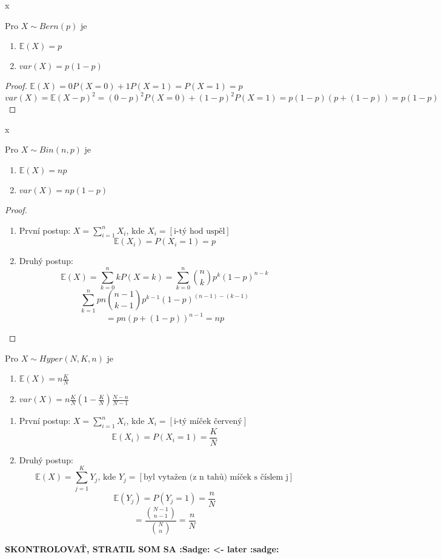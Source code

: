 \documentclass[../main.tex]{subfiles}
\begin{document}
\begin{theorem}
    {\color{white} x}

    Pro $X\sim Bern(p)$ je 
    \begin{enumerate}
        \item $\mathbb{E}(X) = p$
        \item $var(X) = p(1-p)$
    \end{enumerate}
\end{theorem}
\begin{proof}
    $\mathbb{E}(X) = 0P(X=0)+1P(X=1) = P(X=1) = p$\\
    $var(X) = \mathbb{E}(X-p)^2 = (0-p)^2P(X=0) + (1-p)^2P(X=1) = p(1-p)(p+(1-p)) = p(1-p)$
\end{proof}

\begin{theorem}
    {\color{white} x}

    Pro $X\sim Bin(n,p)$ je
    \begin{enumerate}
        \item $\mathbb{E}(X) = np$
        \item $var(X) = np(1-p)$
    \end{enumerate}
\end{theorem}
\begin{proof}
    \begin{enumerate}
        \item První postup: $X = \sum^n_{i=1}X_i$, kde $X_i = [\text{i-tý hod uspěl}]$
        \[\mathbb{E}(X_i) = P(X_i = 1) = p\]
        \item Druhý postup:
        \[\mathbb{E}(X) = \sum^n_{k=0} kP(X=k) = \sum^n_{k=0}\binom{n}{k}p^k(1-p)^{n-k}\]
        \[\sum_{k=1}^n pn \binom{n-1}{k-1}p^{k-1}(1-p)^{(n-1) - (k-1)}\]
        \[ = pn (p + (1-p))^{n-1} = np\]
    \end{enumerate}
\end{proof}

\begin{theorem}
    Pro $X\sim Hyper(N,K,n)$ je
    \begin{enumerate}
        \item $\mathbb{E}(X) = n\frac{K}{N}$
        \item $var(X) = n\frac{K}{N}(1-\frac{K}{N})\frac{N-n}{N-1}$
    \end{enumerate}
    \begin{enumerate}
        \item První postup: $X = \sum^n_{i=1}X_i$, kde $X_i = [\text{i-tý míček červený}]$
        \[\mathbb{E}(X_i) = P(X_i = 1) = \frac{K}{N}\]
        \item Druhý postup:
        \[\mathbb{E}(X) = \sum^K_{j=1} Y_j\text{, kde } Y_j = [\text{byl vytažen (z n tahů) míček s číslem j}]\]
        \[\mathbb{E}(Y_j) = P(Y_j = 1) = \frac{n}{N} \]
        \[= \frac{\binom{N-1}{n-1}}{\binom{N}{n}} = \frac{n}{N}\]
    \end{enumerate}
    \textbf{SKONTROLOVAŤ, STRATIL SOM SA :Sadge: <- later :sadge:}
\end{theorem}
\end{document}
